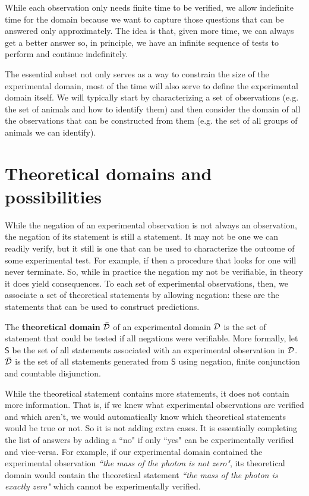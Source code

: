 \documentclass[11pt,letterpaper,fleqn]{memoir} %
\begin{document}
While each observation only needs finite time to be verified, we allow indefinite time for the domain because we want to capture those questions that can be answered only approximately. The idea is that, given more time, we can always get a better answer so, in principle, we have an infinite sequence of tests to perform and continue indefinitely.

The essential subset not only serves as a way to constrain the size of the experimental domain, most of the time will also serve to define the experimental domain itself. We will typically start by characterizing a set of observations (e.g. the set of animals and how to identify them) and then consider the domain of all the observations that can be constructed from them (e.g. the set of all groups of animals we can identify).

\section{Theoretical domains and possibilities}


While the negation of an experimental observation is not always an observation, the negation of its statement is still a statement. It may not be one we can readily verify, but it still is one that can be used to characterize the outcome of some experimental test. For example, if  then a procedure that looks for one will never terminate. So, while in practice the negation my not be verifiable, in theory it does yield consequences. To each set of experimental observations, then, we associate a set of theoretical statements by allowing negation: these are the statements that can be used to construct predictions.

\begin{mathSection}
\begin{defn}
	The \textbf{theoretical domain} $\bar{\mathcal{D}}$ of an experimental domain $\mathcal{D}$ is the set of statement that could be tested if all negations were verifiable. More formally, let $\mathsf{S}$ be the set of all statements associated with an experimental observation in $\mathcal{D}$. $\bar{\mathcal{D}}$ is the set of all statements generated from $\mathsf{S}$ using negation, finite conjunction and countable disjunction.
\end{defn}
\end{mathSection}

While the theoretical statement contains more statements, it does not contain more information. That is, if we knew what experimental observations are verified and which aren't, we would automatically know which theoretical statements would be true or not. So it is not adding extra cases. It is essentially completing the list of answers by adding a ``no" if only ``yes" can be experimentally verified and vice-versa. For example, if our experimental domain contained the experimental observation \emph{``the mass of the photon is not zero"}, its theoretical domain would contain the theoretical statement \emph{``the mass of the photon is exactly zero"} which cannot be experimentally verified.
\end{document}
